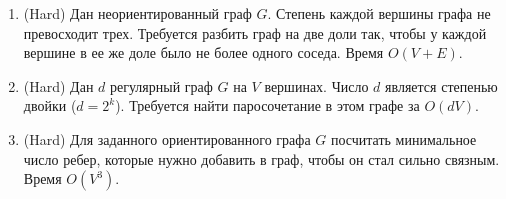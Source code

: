 \begin{enumerate}
  \item (Hard) Дан неориентированный граф $G$. Степень каждой вершины
      графа не превосходит трех. Требуется разбить граф на две доли так,
      чтобы у каждой вершине в ее же доле было не более одного соседа.
      Время $O(V + E)$.

  \item (Hard) Дан $d$ регулярный граф $G$ на $V$ вершинах. 
      Число $d$ является степенью двойки ($d = 2^k$). Требуется
      найти паросочетание в этом графе за $O(dV)$.

  \item (Hard) Для заданного ориентированного графа $G$ посчитать
        минимальное число ребер, которые нужно добавить в граф, чтобы
        он стал сильно связным. Время $O(V^3)$.

\end{enumerate}
